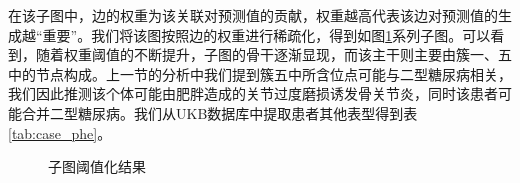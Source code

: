 在该子图中，边的权重为该关联对预测值的贡献，权重越高代表该边对预测值的生成越“重要”。我们将该图按照边的权重进行稀疏化，得到如图\ref{fig:thre_subgraph}系列子图。可以看到，随着权重阈值的不断提升，子图的骨干逐渐显现，而该主干则主要由簇一、五中的节点构成。上一节的分析中我们提到簇五中所含位点可能与二型糖尿病相关，我们因此推测该个体可能由肥胖造成的关节过度磨损诱发骨关节炎，同时该患者可能合并二型糖尿病。我们从UKB数据库中提取患者其他表型得到表\ref{tab:case_phe}。

\begin{figure}[ht]
\centering
{}
\caption{子图阈值化结果}
\label{fig:thre_subgraph}
\end{figure}

